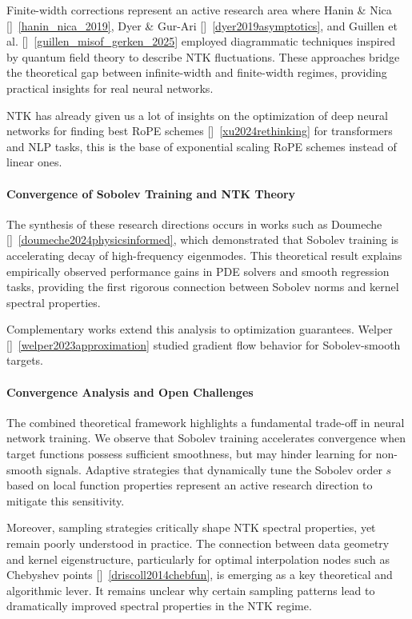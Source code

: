 \documentclass[a4paper]{article}
\theoremstyle{plain}
\theoremstyle{definition}
\theoremstyle{remark}
\begin{document}
Finite-width corrections represent an active research area where Hanin \& Nica []~\ref{hanin_nica_2019}, Dyer \& Gur-Ari []~\ref{dyer2019asymptotics}, and Guillen et al. []~\ref{guillen_misof_gerken_2025} employed diagrammatic techniques inspired by quantum field theory to describe NTK fluctuations. These approaches bridge the theoretical gap between infinite-width and finite-width regimes, providing practical insights for real neural networks.

NTK has already given us a lot of insights on the optimization of deep neural networks for finding best RoPE schemes []~\ref{xu2024rethinking} for transformers and NLP tasks, this is the base of exponential scaling RoPE schemes instead of linear ones.

\paragraph{Convergence of Sobolev Training and NTK Theory}

The synthesis of these research directions occurs in works such as Doumeche []~\ref{doumeche2024physicsinformed}, which demonstrated that Sobolev training is accelerating decay of high-frequency eigenmodes. This theoretical result explains empirically observed performance gains in PDE solvers and smooth regression tasks, providing the first rigorous connection between Sobolev norms and kernel spectral properties.

Complementary works extend this analysis to optimization guarantees. Welper []~\ref{welper2023approximation} studied gradient flow behavior for Sobolev-smooth targets.

\paragraph{Convergence Analysis and Open Challenges}

The combined theoretical framework highlights a fundamental trade-off in neural network training. We observe that Sobolev training accelerates convergence when target functions possess sufficient smoothness, but may hinder learning for non-smooth signals. Adaptive strategies that dynamically tune the Sobolev order $s$ based on local function properties represent an active research direction to mitigate this sensitivity.

Moreover, sampling strategies critically shape NTK spectral properties, yet remain poorly understood in practice. The connection between data geometry and kernel eigenstructure, particularly for optimal interpolation nodes such as Chebyshev points []~\ref{driscoll2014chebfun}, is emerging as a key theoretical and algorithmic lever. It remains unclear why certain sampling patterns lead to dramatically improved spectral properties in the NTK regime.
\end{document}
